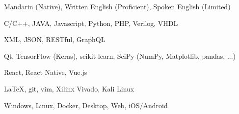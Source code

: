 
\begin{cvtbl}
        {Mandarin (Native), Written English (Proficient), Spoken English (Limited)}

        {C/C++, JAVA, Javascript, Python, PHP, Verilog, VHDL}

        {XML, JSON, RESTful, GraphQL}

        {Qt, TensorFlow (Keras), scikit-learn, SciPy (NumPy, Matplotlib, pandas, ...)}

        {React, React Native, Vue.js}

        {\LaTeX, git, vim, Xilinx Vivado, Kali Linux}

        {Windows, Linux, Docker, Desktop, Web, iOS/Android}
\end{cvtbl}

\endinput